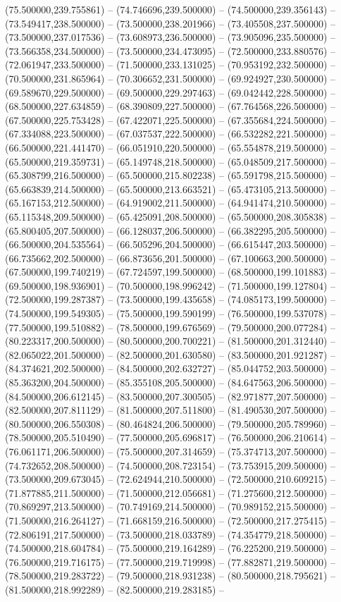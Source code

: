    (75.500000,239.755861) -- (74.746696,239.500000) -- (74.500000,239.356143) -- (73.549417,238.500000) -- (73.500000,238.201966) -- (73.405508,237.500000) -- (73.500000,237.017536) -- (73.608973,236.500000) -- (73.905096,235.500000) -- (73.566358,234.500000) -- (73.500000,234.473095) -- (72.500000,233.880576) -- (72.061947,233.500000) -- (71.500000,233.131025) -- (70.953192,232.500000) -- (70.500000,231.865964) -- (70.306652,231.500000) -- (69.924927,230.500000) -- (69.589670,229.500000) -- (69.500000,229.297463) -- (69.042442,228.500000) -- (68.500000,227.634859) -- (68.390809,227.500000) -- (67.764568,226.500000) -- (67.500000,225.753428) -- (67.422071,225.500000) -- (67.355684,224.500000) -- (67.334088,223.500000) -- (67.037537,222.500000) -- (66.532282,221.500000) -- (66.500000,221.441470) -- (66.051910,220.500000) -- (65.554878,219.500000) -- (65.500000,219.359731) -- (65.149748,218.500000) -- (65.048509,217.500000) -- (65.308799,216.500000) -- (65.500000,215.802238) -- (65.591798,215.500000) -- (65.663839,214.500000) -- (65.500000,213.663521) -- (65.473105,213.500000) -- (65.167153,212.500000) -- (64.919002,211.500000) -- (64.941474,210.500000) -- (65.115348,209.500000) -- (65.425091,208.500000) -- (65.500000,208.305838) -- (65.800405,207.500000) -- (66.128037,206.500000) -- (66.382295,205.500000) -- (66.500000,204.535564) -- (66.505296,204.500000) -- (66.615447,203.500000) -- (66.735662,202.500000) -- (66.873656,201.500000) -- (67.100663,200.500000) -- (67.500000,199.740219) -- (67.724597,199.500000) -- (68.500000,199.101883) -- (69.500000,198.936901) -- (70.500000,198.996242) -- (71.500000,199.127804) -- (72.500000,199.287387) -- (73.500000,199.435658) -- (74.085173,199.500000) -- (74.500000,199.549305) -- (75.500000,199.590199) -- (76.500000,199.537078) -- (77.500000,199.510882) -- (78.500000,199.676569) -- (79.500000,200.077284) -- (80.223317,200.500000) -- (80.500000,200.700221) -- (81.500000,201.312440) -- (82.065022,201.500000) -- (82.500000,201.630580) -- (83.500000,201.921287) -- (84.374621,202.500000) -- (84.500000,202.632727) -- (85.044752,203.500000) -- (85.363200,204.500000) -- (85.355108,205.500000) -- (84.647563,206.500000) -- (84.500000,206.612145) -- (83.500000,207.300505) -- (82.971877,207.500000) -- (82.500000,207.811129) -- (81.500000,207.511800) -- (81.490530,207.500000) -- (80.500000,206.550308) -- (80.464824,206.500000) -- (79.500000,205.789960) -- (78.500000,205.510490) -- (77.500000,205.696817) -- (76.500000,206.210614) -- (76.061171,206.500000) -- (75.500000,207.314659) -- (75.374713,207.500000) -- (74.732652,208.500000) -- (74.500000,208.723154) -- (73.753915,209.500000) -- (73.500000,209.673045) -- (72.624944,210.500000) -- (72.500000,210.609215) -- (71.877885,211.500000) -- (71.500000,212.056681) -- (71.275600,212.500000) -- (70.869297,213.500000) -- (70.749169,214.500000) -- (70.989152,215.500000) -- (71.500000,216.264127) -- (71.668159,216.500000) -- (72.500000,217.275415) -- (72.806191,217.500000) -- (73.500000,218.033789) -- (74.354779,218.500000) -- (74.500000,218.604784) -- (75.500000,219.164289) -- (76.225200,219.500000) -- (76.500000,219.716175) -- (77.500000,219.719998) -- (77.882871,219.500000) -- (78.500000,219.283722) -- (79.500000,218.931238) -- (80.500000,218.795621) -- (81.500000,218.992289) -- (82.500000,219.283185) -- 